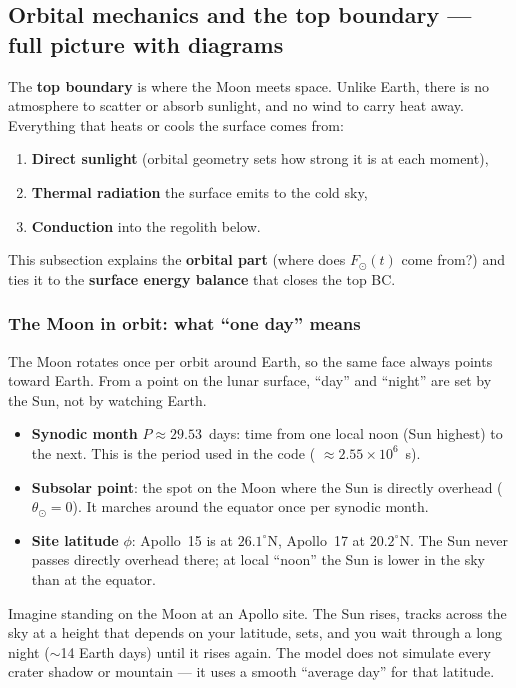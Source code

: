\subsection{Orbital mechanics and the top boundary --- full picture with diagrams}
\label{sec:orbit-top-bc}

The \textbf{top boundary} is where the Moon meets space. Unlike Earth, there is
no atmosphere to scatter or absorb sunlight, and no wind to carry heat away.
Everything that heats or cools the surface comes from:
\begin{enumerate}[leftmargin=1.4em,itemsep=2pt]
  \item \textbf{Direct sunlight} (orbital geometry sets how strong it is at each moment),
  \item \textbf{Thermal radiation} the surface emits to the cold sky,
  \item \textbf{Conduction} into the regolith below.
\end{enumerate}
This subsection explains the \textbf{orbital part} (where does $F_\odot(t)$ come
from?) and ties it to the \textbf{surface energy balance} that closes the top BC.

\subsubsection{The Moon in orbit: what ``one day'' means}

The Moon rotates once per orbit around Earth, so the same face always points
toward Earth. From a point on the lunar surface, ``day'' and ``night'' are set by
the Sun, not by watching Earth.

\begin{itemize}[leftmargin=1.4em,itemsep=2pt]
  \item \textbf{Synodic month} $P \approx 29.53$~days: time from one local noon
    (Sun highest) to the next. This is the period used in the code
    ( $\approx 2.55\times10^6$~\si{s}).
  \item \textbf{Subsolar point}: the spot on the Moon where the Sun is directly
    overhead ($\theta_\odot = 0$). It marches around the equator once per synodic month.
  \item \textbf{Site latitude} $\phi$: Apollo~15 is at $26.1^\circ$N, Apollo~17 at
    $20.2^\circ$N. The Sun never passes directly overhead there; at local ``noon'' the
    Sun is lower in the sky than at the equator.
\end{itemize}

\begin{plainenglish}
Imagine standing on the Moon at an Apollo site. The Sun rises, tracks across the
sky at a height that depends on your latitude, sets, and you wait through a long
night (${\sim}$14 Earth days) until it rises again. The model does not simulate
every crater shadow or mountain --- it uses a smooth ``average day'' for that latitude.
\end{plainenglish}

